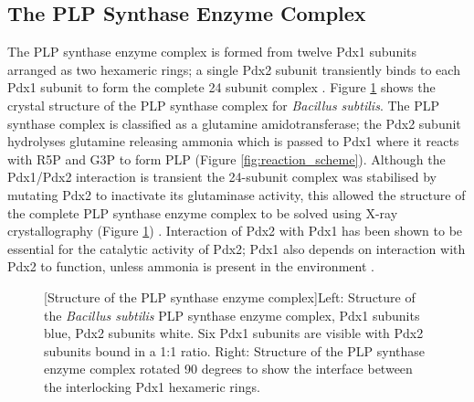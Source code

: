 \clearpage

\subsection{The PLP Synthase Enzyme Complex}

The PLP synthase enzyme complex is formed from twelve Pdx1 subunits arranged as two hexameric rings; a single Pdx2 subunit transiently binds to each Pdx1 subunit to form the complete 24 subunit complex \cite{Strohmeier2006}. Figure \ref{fig:Dodecamer} shows the crystal structure of the PLP synthase complex for \textit{Bacillus subtilis}. The PLP synthase complex is classified as a glutamine amidotransferase; the Pdx2 subunit hydrolyses glutamine releasing ammonia which is passed to Pdx1 where it reacts with R5P and G3P to form PLP (Figure \ref{fig:reaction_scheme}). Although the Pdx1/Pdx2 interaction is transient the 24-subunit complex was stabilised by mutating Pdx2 to inactivate its glutaminase activity, this allowed the structure of the complete PLP synthase enzyme complex to be solved using X-ray crystallography (Figure \ref{fig:Dodecamer}) \cite{Strohmeier2006}. Interaction of Pdx2 with Pdx1 has been shown to be essential for the catalytic activity of Pdx2; Pdx1 also depends on interaction with Pdx2 to function, unless ammonia is present in the environment \cite{Raschle2005}.   

\begin{figure}[!htbp]	
\begin{minipage}{\linewidth}

	[Structure of the PLP synthase enzyme complex]{Left: Structure of the \textit{Bacillus subtilis} PLP synthase enzyme complex, Pdx1 subunits blue, Pdx2 subunits white\cite{Strohmeier2006}. Six Pdx1 subunits are visible with Pdx2 subunits bound in a 1:1 ratio. Right: Structure of the PLP synthase enzyme complex rotated 90 degrees to show the interface between the interlocking Pdx1 hexameric rings.\label{fig:Dodecamer}}	
\end{minipage} 
\end{figure}

